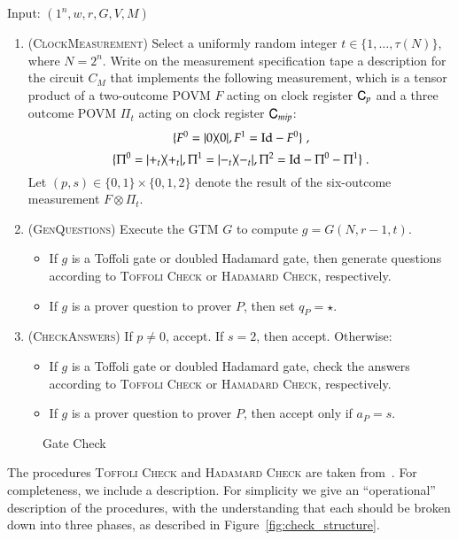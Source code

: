 \vspace{10pt}
\begin{center}
\begin{mdframed}
    Input: $(1^n,w,r,G,V,M)$
	\begin{enumerate}
		\item (\textsc{ClockMeasurement}) Select a uniformly random integer $t\in\{1,\ldots, \tau(N)\}$, where $N = 2^n$. Write on the measurement specification tape a description for the circuit $C_M$ that implements the following measurement, which is a tensor product of a two-outcome POVM $F$ acting on clock register ${\textsf{C}}_p$ and a three outcome POVM $\Pi_t$ acting on clock register ${\textsf{C}}_{mip}$: 
\[
	\{F^0 = |0\rangle\! \langle 0|, F^1 = \mathop{\mathrm{Id}}\!\mathinner{} - F^0 \}\;,
\]
\[
	\{ 	\Pi^0 = |+_t\rangle\! \langle +_t|, 
	\Pi^1 = |-_t\rangle\! \langle -_t|, 
	\Pi^2 = \mathop{\mathrm{Id}}\!\mathinner{} - \Pi^0 - \Pi^1 \}\;.
\]	
Let $(p,s) \in \{0,1\} \times \{0,1,2\}$ denote the result of the six-outcome measurement $F \otimes \Pi_t$.

	\item (\textsc{GenQuestions}) Execute the GTM $G$ to compute $g = G(N,r-1,t)$. 
	\begin{itemize}
		\item If $g$ is a Toffoli gate or doubled Hadamard gate, then generate questions according to \textsc{Toffoli Check} or \textsc{Hadamard Check}, respectively. 
		\item If $g$ is a prover question to prover $P$, then set $q_P = \star$.
	\end{itemize}
		\item (\textsc{CheckAnswers}) If $p \neq 0$, accept. If $s = 2$, then accept. Otherwise:
		\begin{itemize}
			\item If $g$ is a Toffoli gate or doubled Hadamard gate, check the answers according to \textsc{Toffoli Check} or \textsc{Hamadard Check}, respectively. 
			\item If $g$ is a prover question to prover $P$, then accept only if $a_P = s$. 
		\end{itemize}
	\end{enumerate}    
\end{mdframed}

\end{center}
\begin{figure}[H]
\caption{Gate Check}
\label{fig:prop_check}
\end{figure}

The procedures  \textsc{Toffoli Check} and \textsc{Hadamard Check} are taken from~\cite{ji2016compression}. For completeness, we include a description. For simplicity we give an ``operational'' description of the procedures, with the understanding that each should be broken down into three phases, as described in Figure~\ref{fig:check_structure}.

